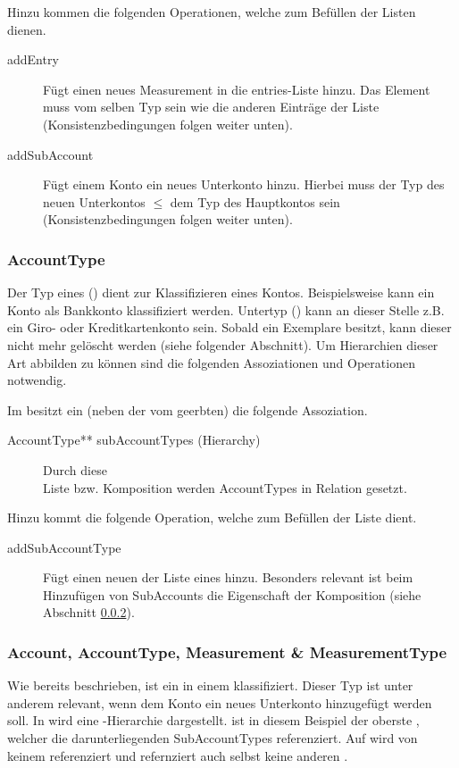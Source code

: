 Hinzu kommen die folgenden Operationen, welche zum Befüllen der Listen dienen.
\begin{description}
	\item[addEntry] Fügt einen neues Measurement in die entries-Liste hinzu. Das Element muss vom selben Typ sein wie die anderen Einträge der Liste (Konsistenzbedingungen folgen weiter unten).  
	\item[addSubAccount] Fügt einem Konto ein neues Unterkonto hinzu. Hierbei muss der Typ des neuen Unterkontos $\leq$ dem Typ des Hauptkontos sein (Konsistenzbedingungen folgen weiter unten).
\end{description}


\subsubsection{AccountType}
Der Typ eines  () dient zur Klassifizieren eines Kontos. Beispielsweise kann ein Konto als Bankkonto klassifiziert werden. Untertyp () kann an dieser Stelle z.B. ein Giro- oder Kreditkartenkonto sein.
Sobald ein  Exemplare besitzt, kann dieser nicht mehr gelöscht werden (siehe folgender Abschnitt). Um Hierarchien dieser Art abbilden zu können sind die folgenden Assoziationen und Operationen notwendig. 

Im \MM besitzt ein  (neben der vom  geerbten) die folgende Assoziation.
\begin{description}
	\item[AccountType** subAccountTypes (Hierarchy)] Durch diese \\Liste bzw. Komposition werden AccountTypes in Relation gesetzt.
\end{description}

Hinzu kommt die folgende Operation, welche zum Befüllen der Liste dient.
\begin{description}
	\item[addSubAccountType] Fügt einen neuen  der  Liste eines  hinzu. Besonders relevant ist beim Hinzufügen 
	von SubAccounts die Eigenschaft der Komposition (siehe Abschnitt \ref{Measurement:accUndAccType}).
\end{description}


\subsubsection{Account, AccountType, Measurement \& MeasurementType}\label{Measurement:accUndAccType}
Wie bereits beschrieben, ist ein  in einem  klassifiziert. Dieser Typ ist unter anderem relevant, wenn dem Konto ein neues Unterkonto hinzugefügt werden soll.  
In  wird eine -Hierarchie dargestellt.  ist in diesem Beispiel der oberste , welcher die darunterliegenden SubAccountTypes referenziert. 
Auf  wird von keinem  referenziert und refernziert auch selbst keine anderen .  

